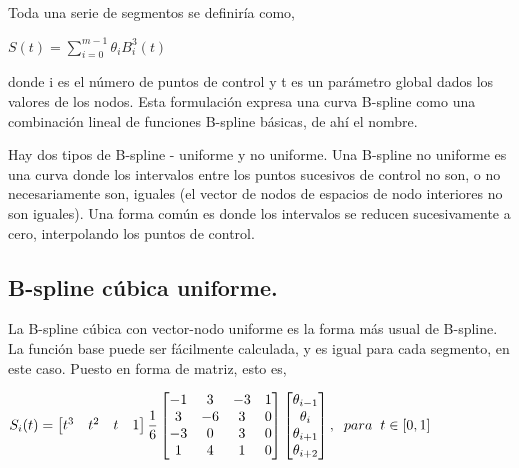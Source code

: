 \hspace{0.4cm} Toda una serie de segmentos se definir\'ia como,

\begin{center}
$\displaystyle{S(t) = \sum_{i=0}^{m-1} \theta_{i} B_{i}^{3}(t)  }$
\end{center}

\noindent donde i es el n\'umero de puntos de control y t es un par\'ametro global dados los valores de los nodos. Esta formulaci\'on expresa una curva B-spline como una combinaci\'on lineal de funciones B-spline b\'asicas, de ah\'i el nombre.

\hspace{0.4cm} Hay dos tipos de B-spline - uniforme y no uniforme. Una B-spline no uniforme es una curva donde los intervalos entre los puntos sucesivos de control no son, o no necesariamente son, iguales (el vector de nodos de espacios de nodo interiores no son iguales). Una forma com\'un es donde los intervalos se reducen sucesivamente a cero, interpolando los puntos de control.


\subsection{B-spline c\'ubica uniforme.\\}

\hspace{0.4cm} La B-spline c\'ubica con vector-nodo uniforme es la forma m\'as usual de B-spline. La funci\'on base puede ser f\'acilmente calculada, y es igual para cada segmento, en este caso. Puesto en forma de matriz, esto es,


\begin{center}
$\displaystyle{S_{i}(t) = \begin{bmatrix} t^3  & t^2 & t & 1  \end{bmatrix} \frac{1}{6} \begin{bmatrix} -1 & 3 & -3 & 1 \\ 3 & -6 & 3 & 0 \\ -3 & 0 & 3 & 0 \\ 1 & 4 & 1 & 0 \end{bmatrix} \begin{bmatrix}  \theta_{i-1} \\ \theta_{i} \\ \theta_{i+1} \\ \theta_{i+2}  \end{bmatrix} , \hspace{0.2cm} para \hspace{0.2cm} t \in [0,1] }$
\end{center}



